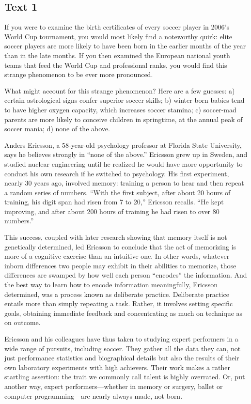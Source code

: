 \newpage
\subsection{Text 1}


If you were to examine the birth certificates of every soccer player in
2006's World Cup tournament, you would most likely find a noteworthy
quirk: elite soccer players are more likely to have been born in the
earlier months of the year than in the late months. If you then examined
the European national youth teams that feed the World Cup and
professional ranks, you would find this strange phenomenon to be ever
more pronounced.

What might account for this strange phenomenon? Here are a few guesses:
a) certain astrological signs confer superior soccer skills; b)
winter-born babies tend to have higher oxygen capacity, which increases
soccer stamina; c) soccer-mad parents are more likely to conceive
children in springtime, at the annual peak of soccer \uline{mania};
d) none of the above.

Anders Ericsson, a 58-year-old psychology professor at Florida State
University, says he believes strongly in ``none of the above.'' Ericsson
grew up in Sweden, and studied nuclear engineering until he realized he
would have more opportunity to conduct his own research if he switched
to psychology. His first experiment, nearly 30 years ago, involved
memory: training a person to hear and then repeat a random series of
numbers. ``With the first subject, after about 20 hours of training, his
digit span had risen from 7 to 20,'' Ericsson recalls. ``He kept
improving, and after about 200 hours of training he had risen to over 80
numbers.''

This success, coupled with later research showing that memory itself is
not genetically determined, led Ericsson to conclude that the act of
memorizing is more of a cognitive exercise than an intuitive one. In
other words, whatever inborn differences two people may exhibit in their
abilities to memorize, those differences are swamped by how well each
person ``encodes'' the information. And the best way to learn how to
encode information meaningfully, Ericsson determined, was a process
known as deliberate practice. Deliberate practice entails more than
simply repeating a task. Rather, it involves setting specific goals,
obtaining immediate feedback and concentrating as much on technique as
on outcome.

Ericsson and his colleagues have thus taken to studying expert
performers in a wide range of pursuits, including soccer. They gather
all the data they can, not just performance statistics and biographical
details but also the results of their own laboratory experiments with
high achievers. Their work makes a rather startling assertion: the trait
we commonly call talent is highly overrated. Or, put another way, expert
performers---whether in memory or surgery, ballet or computer
programming---are nearly always made, not born.


